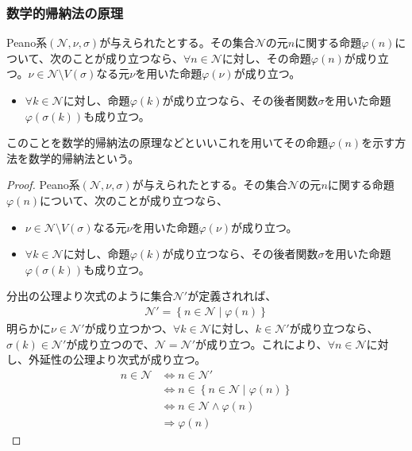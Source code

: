 \documentclass[dvipdfmx]{jsarticle}
\begin{document}
\subsubsection{数学的帰納法の原理}%
\begin{thm}[数学的帰納法の原理]\label{1.2.4.6}
Peano系$\left( \mathcal{N,}\nu,\sigma \right)$が与えられたとする。その集合$\mathcal{N}$の元$n$に関する命題$\varphi(n)$について、次のことが成り立つなら、$\forall n \in \mathcal{N}$に対し、その命題$\varphi(n)$が成り立つ。$\nu \in \mathcal{N} \setminus V(\sigma)$なる元$\nu$を用いた命題$\varphi(\nu)$が成り立つ。
\begin{itemize}
\item
  $\forall k \in \mathcal{N}$に対し、命題$\varphi(k)$が成り立つなら、その後者関数$\sigma$を用いた命題$\varphi\left( \sigma(k) \right)$も成り立つ。
\end{itemize}\par
このことを数学的帰納法の原理などといいこれを用いてその命題$\varphi(n)$を示す方法を数学的帰納法という。
\end{thm}
\begin{proof}
Peano系$\left( \mathcal{N,}\nu,\sigma \right)$が与えられたとする。その集合$\mathcal{N}$の元$n$に関する命題$\varphi(n)$について、次のことが成り立つなら、
\begin{itemize}
\item
  $\nu \in \mathcal{N \setminus}V(\sigma)$なる元$\nu$を用いた命題$\varphi(\nu)$が成り立つ。
\item
  $\forall k \in \mathcal{N}$に対し、命題$\varphi(k)$が成り立つなら、その後者関数$\sigma$を用いた命題$\varphi\left( \sigma(k) \right)$も成り立つ。
\end{itemize}
分出の公理より次式のように集合$\mathcal{N}'$が定義されれば、
\begin{align*}
\mathcal{N}' = \left\{ n \in \mathcal{N} \middle| \varphi(n) \right\}
\end{align*}
明らかに$\nu \in \mathcal{N}'$が成り立つかつ、$\forall k \in \mathcal{N}$に対し、$k \in \mathcal{N}'$が成り立つなら、$\sigma(k) \in \mathcal{N}'$が成り立つので、$\mathcal{N} =\mathcal{N}'$が成り立つ。これにより、$\forall n \in \mathcal{N}$に対し、外延性の公理より次式が成り立つ。
\begin{align*}
n \in \mathcal{N} &\Leftrightarrow n \in \mathcal{N}'\\
&\Leftrightarrow n \in \left\{ n \in \mathcal{N} \middle| \varphi(n) \right\}\\
&\Leftrightarrow n \in \mathcal{N \land}\varphi(n)\\
&\Rightarrow \varphi(n)
\end{align*}
\end{proof}
\end{document}
